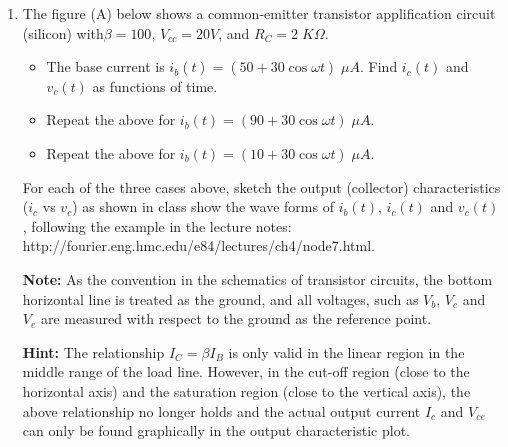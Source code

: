 \begin{enumerate}
\item The figure (A) below shows a common-emitter transistor 
applification circuit (silicon) with$\beta=100$, $V_{cc}=20V$, 
and $R_C=2\;K\Omega$. 
\begin{itemize}
\item The base current is $i_b(t)=(50+30 \cos \omega t)\;\mu A$.
Find $i_c(t)$ and $v_c(t)$ as functions of time.
\item Repeat the above for $i_b(t)=(90+30 \cos \omega t)\;\mu A$.
\item Repeat the above for $i_b(t)=(10+30 \cos \omega t)\;\mu A$.
\end{itemize}
For each of the three cases above, sketch the output (collector) 
characteristics ($i_c$ vs $v_c$) as shown in class show the wave
forms of $i_b(t)$, $i_c(t)$ and $v_c(t)$, following the example
in the lecture notes:
http://fourier.eng.hmc.edu/e84/lectures/ch4/node7.html.

{\bf Note:} As the convention in the schematics of transistor circuits,
the bottom horizontal line is treated as the ground, and all voltages,
such as $V_b$, $V_c$ and $V_e$ are measured with respect to the 
ground as the reference point.

{\bf Hint:} The relationship $I_C=\beta I_B$ is only valid in the
linear region in the middle range of the load line. However, in 
the cut-off region (close to the horizontal axis) and the saturation
region (close to the vertical axis), the above relationship no
longer holds and the actual output current $I_c$ and $V_{ce}$ can
only be found graphically in the output characteristic plot.





\end{enumerate}
